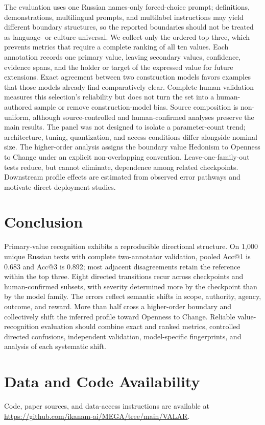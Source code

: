 \documentclass[runningheads,a4paper]{llncs}
\begin{document}
The evaluation uses one Russian names-only forced-choice prompt; definitions,
demonstrations, multilingual prompts, and multilabel instructions may yield
different boundary structures, so the reported boundaries should not be
treated as language- or culture-universal. We collect only the ordered top
three, which prevents metrics that require a complete ranking of all ten
values. Each annotation records one primary value, leaving secondary values,
confidence, evidence spans, and the holder or target of the expressed value
for future extensions. Exact agreement between two construction models favors
examples that those models already find comparatively clear. Complete human
validation measures this selection's reliability but does not turn the set
into a human-authored sample or remove construction-model bias. Source
composition is non-uniform, although source-controlled and human-confirmed
analyses preserve the main results. The panel was not designed to isolate a
parameter-count trend; architecture, tuning, quantization, and access
conditions differ alongside nominal size. The higher-order analysis assigns
the boundary value Hedonism to Openness to Change under an explicit
non-overlapping convention. Leave-one-family-out tests reduce, but cannot
eliminate, dependence among related checkpoints. Downstream profile effects
are estimated from observed error pathways and motivate direct deployment
studies.

\section{Conclusion}

Primary-value recognition exhibits a reproducible directional structure. On 1,000 unique Russian texts with complete two-annotator validation, pooled Acc@1 is 0.683 and Acc@3 is 0.892; most adjacent disagreements retain the reference within the top three. Eight directed transitions recur across checkpoints and human-confirmed subsets, with severity determined more by the checkpoint than by the model family. The errors reflect semantic shifts in scope, authority, agency, outcome, and reward. More than half cross a higher-order boundary and collectively shift the inferred profile toward Openness to Change. Reliable value-recognition evaluation should combine exact and ranked metrics, controlled directed confusions, independent validation, model-specific fingerprints, and analysis of each systematic shift.

\section*{Data and Code Availability}
Code, paper sources, and data-access instructions are available at
\url{https://github.com/ikanam-ai/MEGA/tree/main/VALAR}.
\end{document}

